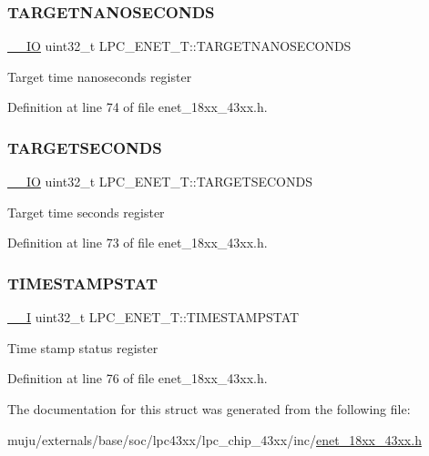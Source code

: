 \subsubsection{\texorpdfstring{T\+A\+R\+G\+E\+T\+N\+A\+N\+O\+S\+E\+C\+O\+N\+DS}{TARGETNANOSECONDS}}
{\footnotesize\ttfamily \hyperlink{core__sc300_8h_aec43007d9998a0a0e01faede4133d6be}{\+\_\+\+\_\+\+IO} uint32\+\_\+t L\+P\+C\+\_\+\+E\+N\+E\+T\+\_\+\+T\+::\+T\+A\+R\+G\+E\+T\+N\+A\+N\+O\+S\+E\+C\+O\+N\+DS}

Target time nanoseconds register 

Definition at line 74 of file enet\+\_\+18xx\+\_\+43xx.\+h.

\mbox{\label{struct_l_p_c___e_n_e_t___t_a22e1e0b41642bcae8d9386224f72bbec}} 
\subsubsection{\texorpdfstring{T\+A\+R\+G\+E\+T\+S\+E\+C\+O\+N\+DS}{TARGETSECONDS}}
{\footnotesize\ttfamily \hyperlink{core__sc300_8h_aec43007d9998a0a0e01faede4133d6be}{\+\_\+\+\_\+\+IO} uint32\+\_\+t L\+P\+C\+\_\+\+E\+N\+E\+T\+\_\+\+T\+::\+T\+A\+R\+G\+E\+T\+S\+E\+C\+O\+N\+DS}

Target time seconds register 

Definition at line 73 of file enet\+\_\+18xx\+\_\+43xx.\+h.

\mbox{\label{struct_l_p_c___e_n_e_t___t_aac72e693e97565deecfab049c7151edf}} 
\subsubsection{\texorpdfstring{T\+I\+M\+E\+S\+T\+A\+M\+P\+S\+T\+AT}{TIMESTAMPSTAT}}
{\footnotesize\ttfamily \hyperlink{core__sc300_8h_af63697ed9952cc71e1225efe205f6cd3}{\+\_\+\+\_\+I} uint32\+\_\+t L\+P\+C\+\_\+\+E\+N\+E\+T\+\_\+\+T\+::\+T\+I\+M\+E\+S\+T\+A\+M\+P\+S\+T\+AT}

Time stamp status register 

Definition at line 76 of file enet\+\_\+18xx\+\_\+43xx.\+h.



The documentation for this struct was generated from the following file\+:\begin{DoxyCompactItemize}
\item 
muju/externals/base/soc/lpc43xx/lpc\+\_\+chip\+\_\+43xx/inc/\hyperlink{enet__18xx__43xx_8h}{enet\+\_\+18xx\+\_\+43xx.\+h}\end{DoxyCompactItemize}
